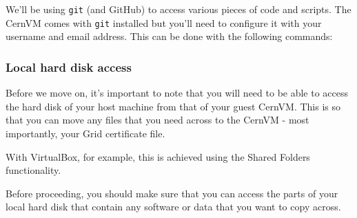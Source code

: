 We'll be using \texttt{git} (and GitHub) to access various pieces of
code and scripts. The CernVM comes with \texttt{git} installed but
you'll need to configure it with your username and email address. This
can be done with the following commands:

\begin{Shaded}
\begin{Highlighting}[]
\NormalTok{$ } 
\NormalTok{$ } 
\end{Highlighting}
\end{Shaded}

\subsubsection{Local hard disk access}\label{local-hard-disk-access}

Before we move on, it's important to note that you will need to be able
to access the hard disk of your host machine from that of your guest
CernVM. This is so that you can move any files that you need across to
the CernVM - most importantly, your Grid certificate file.

With VirtualBox, for example, this is achieved using the Shared Folders
functionality.

Before proceeding, you should make sure that you can access the parts of
your local hard disk that contain any software or data that you want to
copy across.




